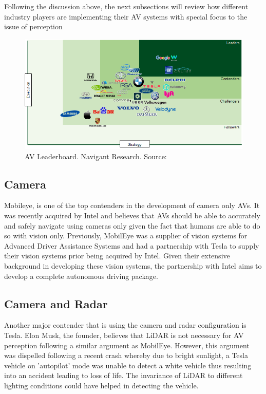 Following the discussion above, the next subsections will review how different industry players are implementing their AV systems with special focus to the issue of perception
\begin{figure}
	\includegraphics[width=\textwidth]{media/avind.png}
	\caption{AV Leaderboard. Navigant Research. Source:\cite{navigantresearch_2018}}
\end{figure}
\subsection{Camera}
Mobileye\cite{mobileye_2018}, is one of the top contenders in the development of camera only AVs. It was recently acquired by Intel and believes that AVs should be able to accurately and safely navigate using cameras only given the fact that humans are able to do so with vision only. Previously, MobilEye was a supplier of vision systems for Advanced Driver Assistance Systems and had a partnership with Tesla to supply their vision systems prior being acquired by Intel. 
Given their extensive background in developing these vision systems, the partnership with Intel aims to develop a complete autonomous driving package.\cite{intelsolutions_2018}
 

\subsection{Camera and  Radar}
Another major contender that is using the camera and radar configuration is Tesla. Elon Musk, the founder, believes that LiDAR is not necessary for AV perception following a similar argument as MobilEye. However, this argument was dispelled following a recent crash whereby due to bright sunlight, a Tesla vehicle on 'autopilot' mode was unable to detect a white vehicle thus resulting into an accident leading to loss of life. The invariance of LiDAR to different lighting conditions could have helped in detecting the vehicle. 


